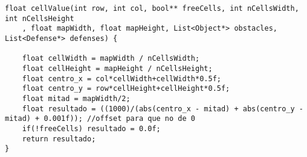 \begin{lstlisting}
float cellValue(int row, int col, bool** freeCells, int nCellsWidth, int nCellsHeight
	, float mapWidth, float mapHeight, List<Object*> obstacles, List<Defense*> defenses) {

    float cellWidth = mapWidth / nCellsWidth; 
    float cellHeight = mapHeight / nCellsHeight; 
    float centro_x = col*cellWidth+cellWidth*0.5f;
    float centro_y = row*cellHeight+cellHeight*0.5f;
    float mitad = mapWidth/2;
    float resultado = ((1000)/(abs(centro_x - mitad) + abs(centro_y - mitad) + 0.001f)); //offset para que no de 0
    if(!freeCells) resultado = 0.0f;
	return resultado; 
}
\end{lstlisting}

\vspace{5mm}
